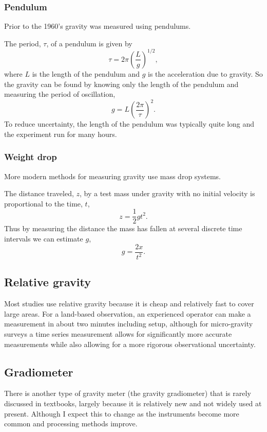 \subsubsection{Pendulum}
Prior to the 1960's gravity was measured using pendulums.  

The period, $\tau$, of a pendulum is given by
\begin{equation}
    \tau = 2\pi \left( \frac{L}{g} \right)^{1/2},
\end{equation}
where $L$ is the length of the pendulum and $g$ is the acceleration due to gravity.  So the gravity can be found by knowing only the length of the pendulum and measuring the period of oscillation,
\begin{equation}
    g = L \left( \frac{2 \pi}{\tau} \right)^{2}.
\end{equation}
To reduce uncertainty, the length of the pendulum was typically quite long and the experiment run for many hours.

\subsubsection{Weight drop}
More modern methods for measuring gravity use mass drop systems.

The distance traveled, $z$, by a test mass under gravity with no initial velocity is proportional to the time, $t$,
\begin{equation}
    z = \frac{1}{2}gt^{2}.
\end{equation}
Thus by measuring the distance the mass has fallen at several discrete time intervals we can estimate $g$,
\begin{equation}
    g = \frac{2x}{t^2}.
\end{equation}

\subsection{Relative gravity}
Most studies use relative gravity because it is cheap and relatively fast to cover large areas.  For a land-based observation, an experienced operator can make a measurement in about two minutes including setup, although for micro-gravity surveys a time series measurement allows for significantly more accurate measurements while also allowing for a more rigorous observational uncertainty.

\subsection{Gradiometer}
There is another type of gravity meter (the gravity gradiometer) that is rarely discussed in textbooks, largely because it is relatively new and not widely used at present.  Although I expect this to change as the instruments become more common and processing methods improve.


